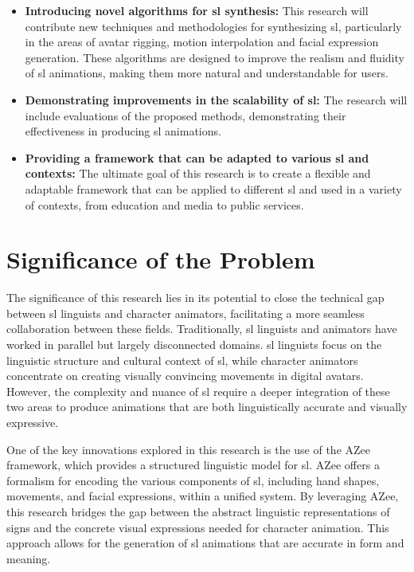 \documentclass[../../main.tex]{subfiles}
\begin{document}
\begin{itemize}
    \item \textbf{Introducing novel algorithms for \gls{sl} synthesis:} This research will contribute new techniques and methodologies for synthesizing \gls{sl}, particularly in the areas of avatar rigging, motion interpolation and facial expression generation. These algorithms are designed to improve the realism and fluidity of \gls{sl} animations, making them more natural and understandable for users.
    \item \textbf{Demonstrating improvements in the scalability of \gls{sl}:} The research will include evaluations of the proposed methods, demonstrating their effectiveness in producing \gls{sl} animations.
    \item \textbf{Providing a framework that can be adapted to various \gls{sl} and contexts:} The ultimate goal of this research is to create a flexible and adaptable framework that can be applied to different \gls{sl} and used in a variety of contexts, from education and media to public services.
\end{itemize}

\section{Significance of the Problem}
\label{ch:introduction:significance}

The significance of this research lies in its potential to close the technical gap between \gls{sl} linguists and character animators, facilitating a more seamless collaboration between these fields. Traditionally, \gls{sl} linguists and animators have worked in parallel but largely disconnected domains. \gls{sl} linguists focus on the linguistic structure and cultural context of \gls{sl}, while character animators concentrate on creating visually convincing movements in digital avatars. However, the complexity and nuance of \gls{sl} require a deeper integration of these two areas to produce animations that are both linguistically accurate and visually expressive.

One of the key innovations explored in this research is the use of the AZee framework, which provides a structured linguistic model for \gls{sl}. AZee offers a formalism for encoding the various components of \gls{sl}, including hand shapes, movements, and facial expressions, within a unified system. By leveraging AZee, this research bridges the gap between the abstract linguistic representations of signs and the concrete visual expressions needed for character animation. This approach allows for the generation of \gls{sl} animations that are accurate in form and meaning.
\end{document}
